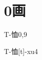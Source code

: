 
\section*{0画}

\begin{entry}{T-恤}{0,9}
  \begin{phonetics}{T-恤}{[t]-xu4}
  \end{phonetics}
\end{entry}


